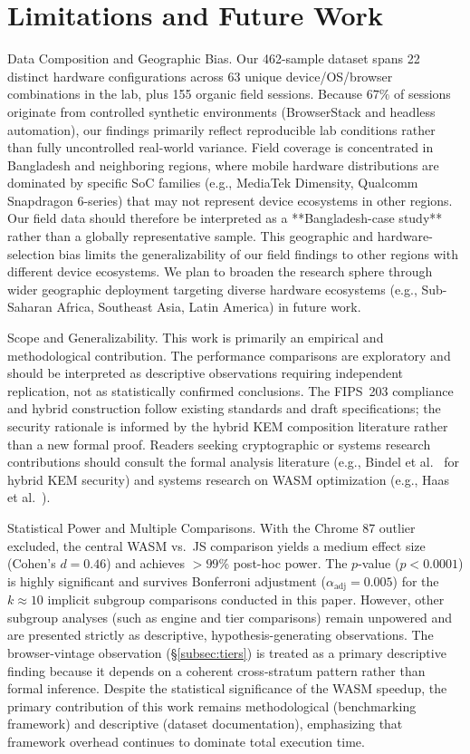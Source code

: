 \documentclass[11pt,a4paper]{article}
\def\textbf#1{#1}%
\begin{document}
\section{Limitations and Future Work}
\label{sec:limitations}

\textbf{Data Composition and Geographic Bias.} Our 462-sample dataset spans 22 distinct hardware configurations across 63 unique device/OS/browser combinations in the lab, plus 155 organic field sessions. Because $67\%$ of sessions originate from controlled synthetic environments (BrowserStack and headless automation), our findings primarily reflect reproducible lab conditions rather than fully uncontrolled real-world variance. Field coverage is concentrated in Bangladesh and neighboring regions, where mobile hardware distributions are dominated by specific SoC families (e.g., MediaTek Dimensity, Qualcomm Snapdragon 6-series) that may not represent device ecosystems in other regions. Our field data should therefore be interpreted as a **Bangladesh-case study** rather than a globally representative sample. This geographic and hardware-selection bias limits the generalizability of our field findings to other regions with different device ecosystems. We plan to broaden the research sphere through wider geographic deployment targeting diverse hardware ecosystems (e.g., Sub-Saharan Africa, Southeast Asia, Latin America) in future work.

\textbf{Scope and Generalizability.} This work is primarily an empirical and methodological contribution. The performance comparisons are exploratory and should be interpreted as descriptive observations requiring independent replication, not as statistically confirmed conclusions. The FIPS~203 compliance and hybrid construction follow existing standards and draft specifications; the security rationale is informed by the hybrid KEM composition literature rather than a new formal proof. Readers seeking cryptographic or systems research contributions should consult the formal analysis literature (e.g., Bindel et al.~\cite{bindel2019hybrid} for hybrid KEM security) and systems research on WASM optimization (e.g., Haas et al.~\cite{haas2017webassembly}).

\textbf{Statistical Power and Multiple Comparisons.} With the Chrome 87 outlier excluded, the central WASM vs.\ JS comparison yields a medium effect size (Cohen's $d = 0.46$) and achieves $>99$\% post-hoc power. The $p$-value ($p < 0.0001$) is highly significant and survives Bonferroni adjustment ($\alpha_{\text{adj}} = 0.005$) for the $k \approx 10$ implicit subgroup comparisons conducted in this paper. However, other subgroup analyses (such as engine and tier comparisons) remain unpowered and are presented strictly as descriptive, hypothesis-generating observations. The browser-vintage observation (\S\ref{subsec:tiers}) is treated as a primary descriptive finding because it depends on a coherent cross-stratum pattern rather than formal inference. Despite the statistical significance of the WASM speedup, the primary contribution of this work remains methodological (benchmarking framework) and descriptive (dataset documentation), emphasizing that framework overhead continues to dominate total execution time.
\end{document}
